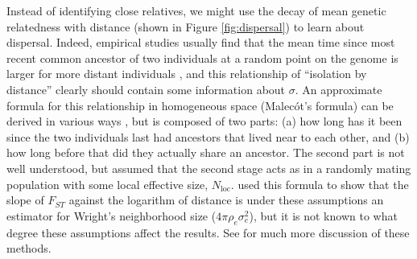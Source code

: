 \documentclass{ar-1col}
\begin{document}
Instead of identifying close relatives,
we might use the decay of mean genetic relatedness with distance 
(shown in Figure \ref{fig:dispersal}) 
to learn about dispersal.
Indeed, empirical studies usually find that
the mean time since most recent common ancestor 
of two individuals at a random point on the genome
is larger for more distant individuals \citep{sexton2013genetic,epperson2003geographical,charlesworth2003effects},
and this relationship  of ``isolation by distance'' 
clearly should contain some information about $\sigma$.
An approximate formula for this relationship
in homogeneous space (Malec\'ot's formula)
can be derived in various ways 
\citep{malecot, sawyer1976branching, barton1995genealogies, rousset_1997, barton-depaulis-etheridge, robledoarnuncio2010isolation, ringbauer2017inferring, alasadi2018estimating},
but is composed of two parts: 
(a) how long has it been since the two individuals last had ancestors that lived near to each other,
and (b) how long before that did they actually share an ancestor.
The second part is not well understood,
but \citet{malecot} assumed that the second stage acts as in a randomly mating population
with some local effective size, $N_\text{loc}$.
\citet{rousset_1997} used this formula to show that
the slope of $F_{ST}$ against the logarithm of distance
is under these assumptions an estimator for Wright's neighborhood size ($4 \pi \rho_e \sigma_e^2$),
but it is not known to what degree these assumptions affect the results.
See \citet{barton1995genealogies} for much more discussion of these methods.
\end{document}
